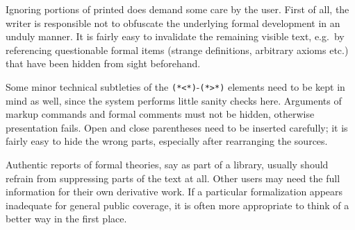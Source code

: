 \begin{isabellebody}
\begin{isamarkuptext}
  \medskip Ignoring portions of printed does demand some care by the
  user.  First of all, the writer is responsible not to obfuscate the
  underlying formal development in an unduly manner.  It is fairly
  easy to invalidate the remaining visible text, e.g.\ by referencing
  questionable formal items (strange definitions, arbitrary axioms
  etc.) that have been hidden from sight beforehand.

  Some minor technical subtleties of the
  \verb,(,\verb,*,\verb,<,\verb,*,\verb,),-\verb,(,\verb,*,\verb,>,\verb,*,\verb,),
  elements need to be kept in mind as well, since the system performs
  little sanity checks here.  Arguments of markup commands and formal
  comments must not be hidden, otherwise presentation fails.  Open and
  close parentheses need to be inserted carefully; it is fairly easy
  to hide the wrong parts, especially after rearranging the sources.

  \medskip Authentic reports of formal theories, say as part of a
  library, usually should refrain from suppressing parts of the text
  at all.  Other users may need the full information for their own
  derivative work.  If a particular formalization appears inadequate
  for general public coverage, it is often more appropriate to think
  of a better way in the first place.%
\end{isamarkuptext}%
\isamarkuptrue%
\isamarkupfalse%
\end{isabellebody}%
